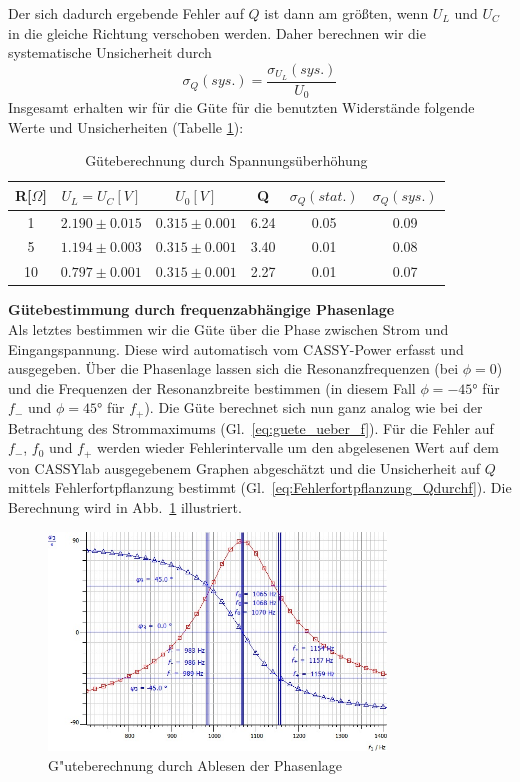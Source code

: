 \documentclass[12pt,a4paper]{article}
\begin{document}
Der sich dadurch ergebende Fehler auf $Q$ ist dann am größten, wenn $U_L$ und $U_C$ in die gleiche Richtung verschoben werden. Daher berechnen wir die systematische Unsicherheit durch
\begin{equation}
\sigma_Q(sys.)=\frac{\sigma_{U_L}(sys.)}{U_0}
\end{equation}
Insgesamt erhalten wir für die Güte für die benutzten Widerstände folgende Werte und Unsicherheiten (Tabelle \ref{table:S_U}):
\begin{table}[H]
	\centering
	\begin{tabular}{|c|c|c|c|c|c|}
		\hline
		R[$\Omega$]&$U_L=U_C[V]$&$U_0[V]$&Q&$\sigma_Q(stat.)$&$\sigma_Q(sys.)$\\
		\hline
		1&$2.190\pm0.015$&$0.315\pm0.001$&6.24&0.05&0.09\\
		5&$1.194\pm0.003$&$0.315\pm0.001$&3.40&0.01&0.08\\
		10&$0.797\pm0.001$&$0.315\pm0.001$&2.27&0.01&0.07\\
		\hline		
	\end{tabular}
	\caption{Güteberechnung durch Spannungsüberhöhung}
	\label{table:S_U}
\end{table}
\textbf{Gütebestimmung durch frequenzabhängige Phasenlage}\\
Als letztes bestimmen wir die Güte über die Phase zwischen Strom und Eingangspannung. Diese wird automatisch vom CASSY-Power erfasst und ausgegeben. Über die Phasenlage lassen sich die Resonanzfrequenzen (bei $\phi=0$) und die Frequenzen der Resonanzbreite bestimmen (in diesem Fall $\phi=-\ang{45}$ für $f_-$ und $\phi=\ang{45}$ für $f_+$). Die Güte berechnet sich nun ganz analog wie bei der Betrachtung des Strommaximums (Gl.~\eqref{eq:guete_ueber_f}). Für die Fehler auf $f_-$, $f_0$ und $f_+$ werden wieder Fehlerintervalle um den abgelesenen Wert auf dem von CASSYlab ausgegebenem Graphen abgeschätzt und die Unsicherheit auf $Q$ mittels Fehlerfortpflanzung bestimmt (Gl.~\eqref{eq:Fehlerfortpflanzung_Qdurchf}). Die Berechnung wird in Abb.~\ref{S1Ohm_phi} illustriert.
\begin{figure}[H]
	\centering
	\includegraphics[width=0.8\textwidth]{Daten/S1Ohm_phi.jpg}
	\caption{G"uteberechnung durch Ablesen der Phasenlage}
	\label{S1Ohm_phi}
\end{figure}
\end{document}
